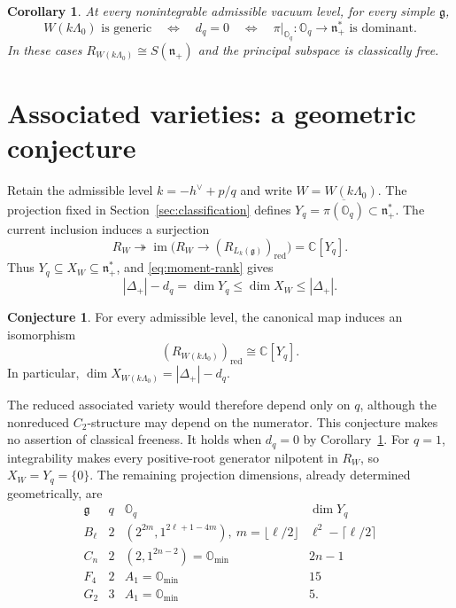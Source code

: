 \documentclass[11pt]{amsart}
\newtheorem{corollary}[theorem]{Corollary}
\theoremstyle{definition}
\newtheorem{conjecture}[theorem]{Conjecture}
\theoremstyle{remark}
\newcommand{\C}{\mathbb C}
\newcommand{\g}{\mathfrak g}
\newcommand{\n}{\mathfrak n_+}
\begin{document}
\begin{corollary}\label{cor:equivalence}
At every nonintegrable admissible vacuum level, for every simple $\g$,
\[
 W(k\Lambda_0)\text{ is generic}
 \quad\Longleftrightarrow\quad d_q=0
 \quad\Longleftrightarrow\quad
 \pi|_{\mathbb O_q}:\mathbb O_q\to\n^*\text{ is dominant}.
\]
In these cases $R_{W(k\Lambda_0)}\cong S(\n)$ and the principal
subspace is classically free.
\end{corollary}

\section{Associated varieties: a geometric conjecture}
\label{subsec:associated-variety-conjecture}
Retain the admissible level $k=-h^\vee+p/q$ and write $W=W(k\Lambda_0)$.
The projection fixed in Section~\ref{sec:classification} defines
$Y_q=\overline{\pi(\mathbb O_q)}\subset\n^*$.
The current inclusion induces a surjection
\[
 R_W\twoheadrightarrow
 \operatorname{im}\bigl(R_W\longrightarrow
 (R_{L_k(\g)})_{\mathrm{red}}\bigr)=\C[Y_q].
\]
Thus $Y_q\subseteq X_W\subseteq\n^*$, and \eqref{eq:moment-rank} gives
\[
 |\Delta_+|-d_q=\dim Y_q\le\dim X_W\le|\Delta_+|.
\]
\begin{conjecture}\label{conj:principal-associated-variety}
For every admissible level, the canonical map induces an isomorphism
\[
 (R_{W(k\Lambda_0)})_{\mathrm{red}}\cong\C[Y_q].
\]
In particular, $\dim X_{W(k\Lambda_0)}=|\Delta_+|-d_q$.
\end{conjecture}
The reduced associated variety would therefore depend only on $q$,
although the nonreduced $C_2$-structure may depend on the numerator.
This conjecture makes no assertion of classical freeness. It holds when
$d_q=0$ by Corollary~\ref{cor:equivalence}. For $q=1$, integrability makes
every positive-root generator nilpotent in $R_W$, so $X_W=Y_q=\{0\}$.
The remaining projection dimensions, already determined geometrically,
are
\[
\begin{array}{c|c|c|c}
\g&q&\mathbb O_q&\dim Y_q\\\hline
B_\ell&2&(2^{2m},1^{2\ell+1-4m}),\ m=\lfloor\ell/2\rfloor&
\ell^2-\lceil\ell/2\rceil\\
C_n&2&(2,1^{2n-2})=\mathbb O_{\min}&2n-1\\
F_4&2&A_1=\mathbb O_{\min}&15\\
G_2&3&A_1=\mathbb O_{\min}&5.
\end{array}
\]
\end{document}
